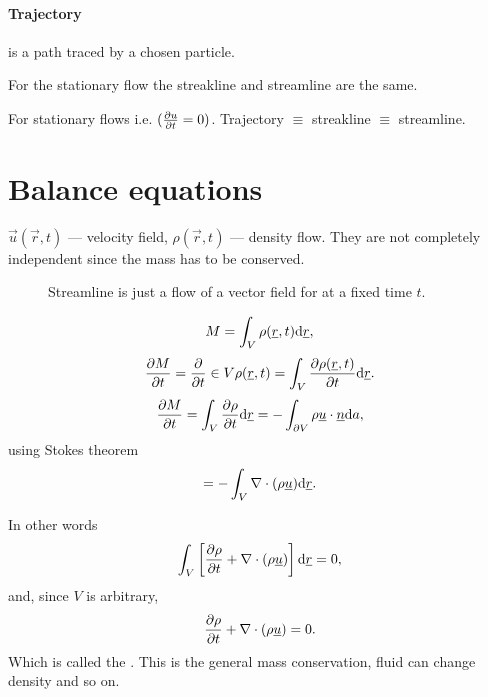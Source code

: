 \documentclass[../main.tex]{subfiles}
\begin{document}
    \paragraph{Trajectory}
     is a path traced by a chosen particle.

    For the stationary flow the streakline and streamline are the same.
    
    For stationary flows i.e. $(\frac{\partial u}{\partial t} = 0)$.
    Trajectory $\equiv$ streakline $\equiv$ streamline.

    \section{Balance equations}
    $\vec u(\vec r, t)$ --- velocity field, $\rho(\vec r, t)$ --- density flow.
    They are not completely independent since the mass has to be conserved.

    \begin{figure}
      \centering
      \caption{Streamline is just a flow of a vector field for at a fixed time $t$.}
      \label{fig:1.12}
    \end{figure}
    
    \begin{displaymath}
      M = \int_V \rho(\underline{r}, t) \mathrm{d} \underline{r},
    \end{displaymath}
    \begin{displaymath}
      \frac{\partial M}{\partial t} = \frac{\partial }{\partial t} \in V \rho(\underline{r}, t) = \int_V \frac{\partial \rho(\underline{r}, t)}{\partial t} \mathrm{d} \underline{r}.
    \end{displaymath}
    \begin{displaymath}
      \frac{\partial M}{\partial t} = \int_V \frac{\partial \rho}{\partial t} \mathrm{d} \underline{r}
      = -\int_{\partial V} \rho \underline{u} \cdot \underline{n} \mathrm{d} a,
    \end{displaymath}
    using Stokes theorem
    \begin{displaymath}
      = - \int_V \nabla \cdot (\rho \underline{u})  \mathrm{d} \underline{r}.
    \end{displaymath}

    In other words
    \begin{displaymath}
      \int_V \left[ \frac{\partial \rho}{\partial t} + \nabla \cdot (\rho \underline{u}) \right] \mathrm{d} \underline{r} = 0 ,
    \end{displaymath}
    and, since $V$ is arbitrary,
    \begin{displaymath}
      \frac{\partial \rho}{\partial t} + \nabla \cdot (\rho \underline{u}) = 0.
    \end{displaymath}
    Which is called the .
    This is the general mass conservation, fluid can change density and so on.
\end{document}

